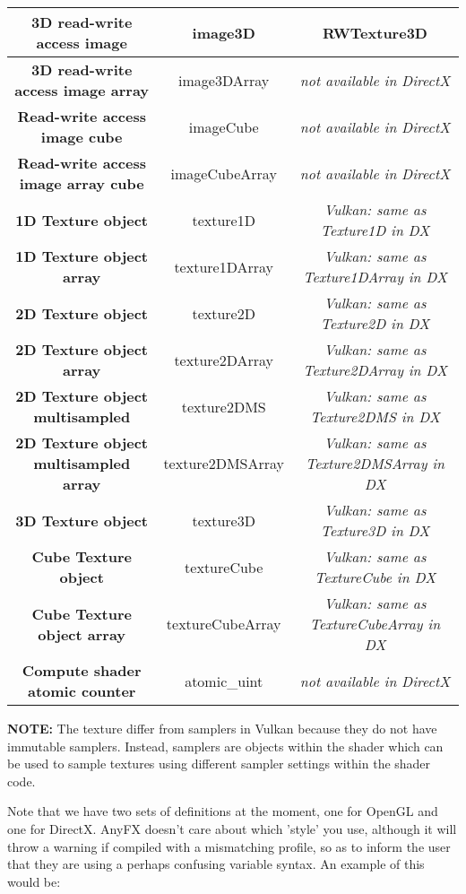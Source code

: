 \documentclass{article}
\begin{document}
\begin{table}[hp]
{\begin{tabular} { | c | c | c | }
	\textbf{3D read-write access image} & image3D & RWTexture3D \\ \hline
	\textbf{3D read-write access image array} & image3DArray & \textit{not available in DirectX} \\ \hline
	\textbf{Read-write access image cube} & imageCube & \textit{not available in DirectX} \\ \hline
	\textbf{Read-write access image array cube} & imageCubeArray & \textit{not available in DirectX} \\ \hline
	\textbf{1D Texture object} & texture1D & \textit{Vulkan: same as Texture1D in DX} \\ \hline
	\textbf{1D Texture object array} & texture1DArray & \textit{Vulkan: same as Texture1DArray in DX} \\ \hline
	\textbf{2D Texture object} & texture2D & \textit{Vulkan: same as Texture2D in DX} \\ \hline
	\textbf{2D Texture object array} & texture2DArray & \textit{Vulkan: same as Texture2DArray in DX} \\ \hline
	\textbf{2D Texture object multisampled} & texture2DMS & \textit{Vulkan: same as Texture2DMS in DX}\\ \hline
	\textbf{2D Texture object multisampled array} & texture2DMSArray & \textit{Vulkan: same as Texture2DMSArray in DX} \\ \hline
	\textbf{3D Texture object} & texture3D & \textit{Vulkan: same as Texture3D in DX}\\ \hline
	\textbf{Cube Texture object} & textureCube & \textit{Vulkan: same as TextureCube in DX} \\ \hline
	\textbf{Cube Texture object array} & textureCubeArray & \textit{Vulkan: same as TextureCubeArray in DX} \\ \hline
	\textbf{Compute shader atomic counter} & atomic\_uint & \textit{not available in DirectX} \\ \hline
\end{tabular}
}
\end{table}
\clearpage

\textbf{NOTE:} The texture differ from samplers in Vulkan because they do not have immutable samplers. Instead, samplers are objects within the shader which can be used to sample textures using different sampler settings within the shader code. 

Note that we have two sets of definitions at the moment, one for OpenGL and one for DirectX. AnyFX doesn't care about which 'style' you use, although it will throw a warning if compiled with a mismatching profile, so as to inform the user that they are using a perhaps confusing variable syntax. An example of this would be:
\end{document}
